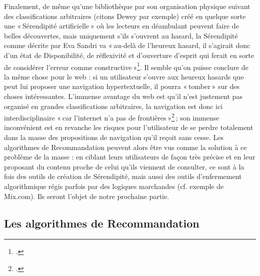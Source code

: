 Finalement, de même qu’une bibliothèque par son organisation physique suivant des classifications arbitraires (citons Dewey par exemple) créé en quelque sorte une « Sérendipité artificielle » où les lecteurs en déambulant peuvent faire de belles découvertes, mais uniquement s’ils s’ouvrent au hasard, la Sérendipité comme décrite par Eva Sandri va « au-delà de l’heureux hasard, il s’agirait donc d’un état de Disponibilité, de réflexivité et d’ouverture d’esprit qui ferait en sorte de considérer l’erreur comme constructive »\footcite[p. 14]{zotero-221}. Il semble qu’on puisse conclure de la même chose pour le web : si un utilisateur s’ouvre aux heureux hasards que peut lui proposer une navigation hypertextuelle, il pourra « tomber » sur des choses intéressantes. L’immense avantage du web est qu’il n’est justement pas organisé en grandes classifications arbitraires, la navigation est donc ici interdisciplinaire « car l’internet n’a pas de frontières »\footcite[8 minutes 34 secondes]{2015} ; son immense inconvénient est en revanche les risques pour l’utilisateur de se perdre totalement dans la masse des propositions de navigation qu’il reçoit sans cesse. Les algorithmes de Recommandation peuvent alors être vus comme la solution à ce problème de la masse : en ciblant leurs utilisateurs de façon très précise et en leur proposant du contenu proche de celui qu’ils viennent de consulter, ce sont à la fois des outils de création de Sérendipité, mais aussi des outils d’enfermement algorithmique régis parfois par des logiques marchandes (cf. exemple de Mix.com). Ils seront l’objet de notre prochaine partie.


\subsection{Les algorithmes de Recommandation}



